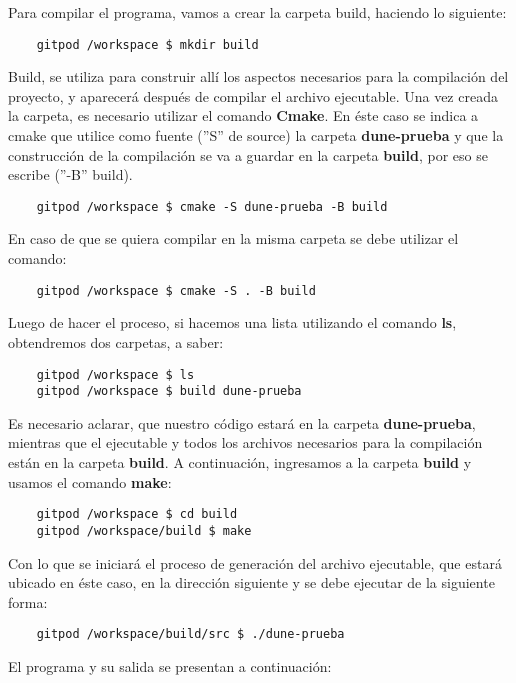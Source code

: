 Para compilar el programa, vamos a crear la  carpeta build, haciendo lo siguiente: 
\begin{verbatim}
	gitpod /workspace $ mkdir build
\end{verbatim}
Build, se utiliza para construir allí los aspectos necesarios para la compilación del proyecto, y aparecerá después 
de compilar el archivo ejecutable.  Una vez creada la carpeta, es necesario utilizar el comando \textbf{Cmake}.  En éste caso se 
indica a cmake que utilice como fuente (''S'' de source) la carpeta \textbf{dune-prueba} y que la construcción de la 
compilación se va a guardar en la carpeta \textbf{build}, por eso se escribe (''-B'' build). 
\begin{verbatim}
	gitpod /workspace $ cmake -S dune-prueba -B build
\end{verbatim}
En caso de que se quiera compilar en la misma carpeta se debe utilizar el comando: 
\begin{verbatim}
	gitpod /workspace $ cmake -S . -B build
\end{verbatim}
Luego de hacer el proceso, si hacemos una lista utilizando el comando \textbf{ls}, obtendremos dos carpetas, a saber:
\begin{verbatim}
	gitpod /workspace $ ls
	gitpod /workspace $ build dune-prueba
\end{verbatim}
Es necesario aclarar, que nuestro código estará en la carpeta \textbf{dune-prueba}, mientras que el ejecutable y 
todos los archivos necesarios para la compilación están en la carpeta \textbf{build}.  A continuación, ingresamos 
a la carpeta \textbf{build} y usamos el comando \textbf{make}:
\begin{verbatim}
	gitpod /workspace $ cd build
	gitpod /workspace/build $ make
\end{verbatim}
Con lo que se iniciará el proceso de generación del archivo ejecutable, que estará ubicado en éste caso, en 
la dirección siguiente y se debe ejecutar de la siguiente forma:
\begin{verbatim}
	gitpod /workspace/build/src $ ./dune-prueba
\end{verbatim}

El programa y su salida se presentan a continuación:
\begin{listing}[ht!]
	\inputminted{bash}{dune-learn-1.txt}
\end{listing}